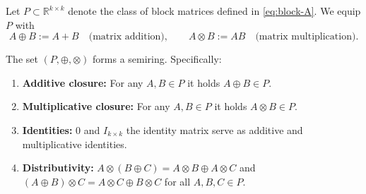 Let $P \subset \mathbb{R}^{k \times k}$ denote the class of block matrices defined in \eqref{eq:block-A}. We equip $P$ with
\[
A \oplus B := A + B \quad \text{(matrix addition)}, \qquad
A \otimes B := A B \quad \text{(matrix multiplication)}.
\]

\begin{prop}
The set $(P, \oplus, \otimes)$ forms a semiring. Specifically:
\begin{enumerate}
    \item \textbf{Additive closure:} For any $A,B \in P$ it holds $A \oplus B \in P$.
    \item \textbf{Multiplicative closure:} For any $A,B \in P$ it holds $A \otimes B \in P$.
    \item \textbf{Identities:} $0$ and $I_{k\times k}$ the identity matrix serve as additive and multiplicative identities.
    \item \textbf{Distributivity:} $A \otimes (B \oplus C) = A \otimes B \oplus A \otimes C$ and $(A \oplus B) \otimes C = A \otimes C \oplus B \otimes C$ for all $A,B,C \in P$.
\end{enumerate}
\end{prop}

